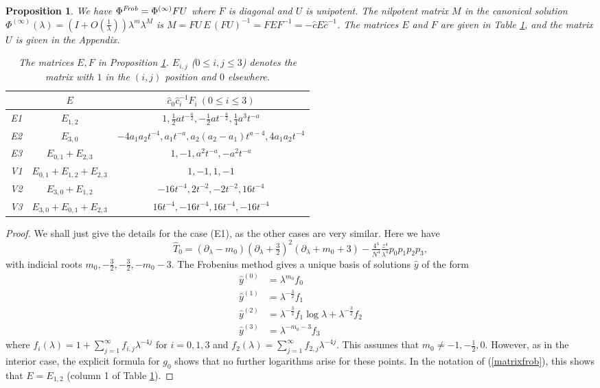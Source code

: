 \documentclass[a4paper,12pt,leqno]{amsart}
\numberwithin{equation}{section}
\theoremstyle{plain}
\newtheorem{proposition}[theorem]{Proposition}
\theoremstyle{definition}
\newcommand{\la}{\lambda}
\renewcommand{\b}{\partial}
\newcommand{\bla}{\b_\la}
\newcommand{\Phii}{\Phi^{(\infty)}}
\newcommand{\nn}{m}
\newcommand{\NN}{M}
\begin{document}
{\begin{proposition}\label{thecases} 
We have $\Phi^{\text{\em{Frob}}} = \Phii FU$ where $F$ is diagonal and $U$ is unipotent. The nilpotent matrix $M$ in the canonical solution $\Phii(\la)=\left(I+O(\tfrac1\la)\right)\la^\nn\la^\NN$ is 
$\NN=FU\,E\,(FU)^{-1}=FEF^{-1}= -\hat c E \hat c^{-1}$. The
matrices $E$ and $F$ are given in Table \ref{t2}, and the matrix $U$ is given in the Appendix.
{\em
\begin{table}[h]
\renewcommand{\arraystretch}{1.5}
\begin{tabular}{c||c|c}
& $E$  & $\hat c_0 \hat c_i^{-1}F_i \ (0\le i\le 3)$
\\
\hline
 E1  & $E_{1,2}$ 
 & $1,\tfrac12a t^{-\frac a2},-\tfrac12a t^{-\frac a2},\tfrac14a^3 t^{-a}$
\\
 E2  & $E_{3,0}$ 
 & $-4a_1a_2t^{-4},a_1 t^{-a},a_2(a_2  \!-\!  a_1) t^{a-4},4a_1a_2 t^{-4}$
\\
 E3  & $E_{0,1}  +  E_{2,3}$ 
 & $1,-1,a^2 t^{-a},-a^2 t^{-a}$
\\
\hline
 V1  &  $E_{0,1}  +  E_{1,2}  +  E_{2,3}$ 
& $1,-1,1,-1$
\\
 V2  & $E_{3,0}  +  E_{1,2}$ 
 & 
$-16t^{-4},2 t^{-2},-2  t^{-2},16  t^{-4}$
\\
 V3  & $E_{3,0}  +  E_{0,1}  +  E_{2,3}$ 
 & $16t^{-4}, -16t^{-4},16  t^{-4},-16  t^{-4}$
\end{tabular}
\bigskip
\caption{The matrices $E,F$ in Proposition \ref{thecases}. $E_{i,j}$ ($0\le i,j\le 3$) denotes the matrix with $1$ in the $(i,j)$ position and $0$ elsewhere.}
\label{t2}
\end{table}
}
\end{proposition}

\begin{proof} 
We shall just give the details
for the case (E1), as the other cases are very similar.  
Here we have 
\[
\hat T_0=
(\bla-\nn_0)(\bla+\tfrac32)^2(\bla+\nn_0+3)
- \tfrac{4^4}{N^4} \tfrac{z^4}{\la^4} p_0p_1p_2p_3,
\]
with indicial roots $\nn_0,-\tfrac32,-\tfrac32,-\nn_0-3$.
The Frobenius method gives 
a unique basis of solutions $\hat y$ of the form 
\begin{align*}
\hat y^{(0)}&=\la^{\nn_0}f_0
\\
\hat y^{(1)}&=
\la^{-\frac32}f_1
\\
\hat y^{(2)}&=
\la^{-\frac32}f_1\log\la+\la^{-\frac32}f_2
\\
\hat y^{(3)}&=
\la^{-\nn_0-3}f_3
\end{align*}
where
$f_i(\la)=1+\sum_{j=1}^\infty f_{i,j}\la^{-4j}$ for $i=0,1,3$ and 
$f_2(\la)=\sum_{j=1}^\infty f_{2,j}\la^{-4j}$.  This assumes that $\nn_0\ne -1, -\tfrac12, 0$. However, as in the interior case, the explicit formula for $g_0$ shows that no further logarithms arise for these points.  In the notation of (\ref{matrixfrob}), this shows that
 $E=E_{1,2}$ (column 1 of Table \ref{t2}).


\end{proof}}
\end{document}
